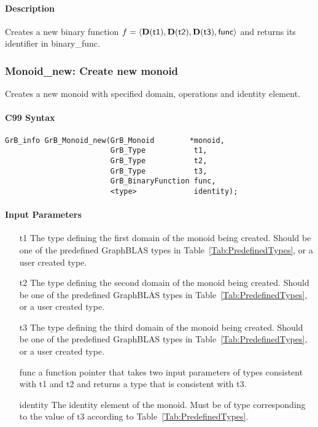\paragraph{Description}

Creates a new binary function $f = \langle \bold{D}({\sf t1}), \bold{D}({\sf t2}), \bold{D}({\sf t3}), {\sf func} \rangle$ and returns its identifier in {\sf binary\_func}.


\subsubsection{{\sf Monoid\_new}: Create new monoid}

Creates a new monoid with specified domain, operations and identity element.

\paragraph{C99 Syntax}

\begin{verbatim}
GrB_info GrB_Monoid_new(GrB_Monoid        *monoid,
                        GrB_Type           t1,
                        GrB_Type           t2,
                        GrB_Type           t3,
                        GrB_BinaryFunction func,
                        <type>             identity);
\end{verbatim}

\paragraph{Input Parameters}

\begin{itemize}[leftmargin=1.1in]
    \item[{\sf t1}] The type defining the first domain of the monoid being created. 
    Should be one of the predefined
    GraphBLAS types in Table~\ref{Tab:PredefinedTypes}, or a user created type.
    \item[{\sf t2}] The type defining the second domain of the monoid being created. 
    Should be one of the predefined
    GraphBLAS types in Table~\ref{Tab:PredefinedTypes}, or a user created type.
    \item[{\sf t3}] The type defining the third domain of the monoid being created. 
    Should be one of the predefined
    GraphBLAS types in Table~\ref{Tab:PredefinedTypes}, or a user created type.
    \item[{\sf func}] a function pointer that takes two input parameters of types consistent
    with t1 and t2 and returns a type that is consistent with t3.
    \item[{\sf identity}] The identity element of the monoid. 
    Must be of type corresponding to the value of {\sf t3} according to Table~\ref{Tab:PredefinedTypes}.
\end{itemize}

